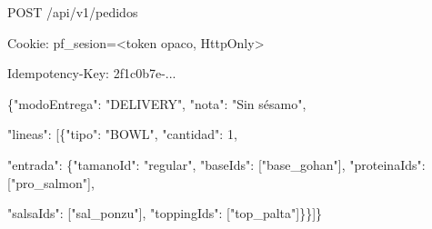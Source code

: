\begin{codigo}
POST /\allowbreak{}api/\allowbreak{}v1/\allowbreak{}pedidos\par
Cookie:\allowbreak{} pf\_\allowbreak{}sesion=\allowbreak{}<token opaco,\allowbreak{} HttpOnly>\par
Idempotency-\allowbreak{}Key:\allowbreak{} 2f1c0b7e-\allowbreak{}.\allowbreak{}.\allowbreak{}.\allowbreak{}\par
\par
\{"modoEntrega":\allowbreak{} "DELIVERY",\allowbreak{} "nota":\allowbreak{} "Sin sésamo",\allowbreak{}\par
\hspace*{1\ttw}"lineas":\allowbreak{} [\allowbreak{}\{"tipo":\allowbreak{} "BOWL",\allowbreak{} "cantidad":\allowbreak{} 1,\allowbreak{}\par
\hspace*{13\ttw}"entrada":\allowbreak{} \{"tamanoId":\allowbreak{} "regular",\allowbreak{} "baseIds":\allowbreak{} [\allowbreak{}"base\_\allowbreak{}gohan"],\allowbreak{} "proteinaIds":\allowbreak{} [\allowbreak{}"pro\_\allowbreak{}salmon"],\allowbreak{}\par
\hspace*{25\ttw}"salsaIds":\allowbreak{} [\allowbreak{}"sal\_\allowbreak{}ponzu"],\allowbreak{} "toppingIds":\allowbreak{} [\allowbreak{}"top\_\allowbreak{}palta"]\}\}]\}\par
\end{codigo}

